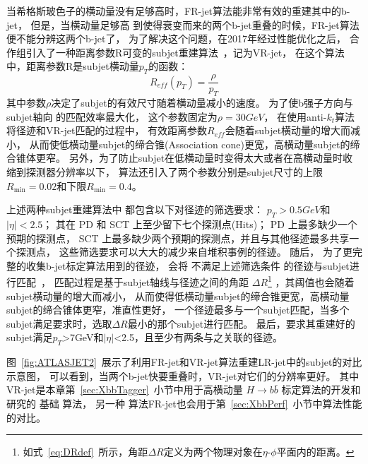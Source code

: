 当希格斯玻色子的横动量没有足够高时，FR-jet算法能非常有效的重建其中的b-jet，
但是，当横动量足够高
到使得衰变而来的两个b-jet重叠的时候，FR-jet算法便不能分辨这两个b-jet了，
为了解决这个问题，在2017年经过性能优化之后，
合作组引入了一种距离参数R可变的subjet重建算法~\cite{VRJET1,VRJET2}，记为VR-jet，
在这个算法中，距离参数R是subjet横动量$p_T$的函数：
\begin{equation} 
\label{eq:VR}
R_{eff}(p_{T})=\frac{\rho}{p_T}
\end{equation}
其中参数$\rho$决定了subjet的有效尺寸随着横动量减小的速度。
为了使b强子方向与subjet轴向
的匹配效率最大化，
这个参数固定为$\rho=30GeV$，
在使用anti-$k_t$算法将径迹和VR-jet匹配的过程中，
有效距离参数$R_{eff}$会随着subjet横动量的增大而减小，
从而使低横动量subjet的缔合锥(Association cone)更宽，高横动量subjet的缔合锥体更窄。
另外，为了防止subjet在低横动量时变得太大或者在高横动量时收缩到探测器分辨率以下，
算法还引入了两个参数分别是subjet尺寸的上限$R_{\text{min}}=0.02$和下限$R_{\text{min}}=0.4$。

上述两种subjet重建算法中
都包含以下对径迹的筛选要求：
$p_{T}>0.5GeV$和$|\eta|<2.5$；
其在
PD
和
SCT
上至少留下七个探测点(Hits)；
PD
上最多缺少一个预期的探测点，
SCT
上最多缺少两个预期的探测点，并且与其他径迹最多共享一个探测点，
这些筛选要求可以大大的减少来自堆积事例的径迹。
随后，
为了更完整的收集b-jet标定算法用到的径迹，
会将
不满足上述筛选条件
的径迹与subjet进行匹配~\cite{TRAVR}，
匹配过程是基于subjet轴线与径迹之间的角距
$\Delta R$\footnote{如式~\ref{eq:DRdef}~所示，角距$\Delta R$定义为两个物理对象在$\eta$-$\phi$平面内的距离。}
，其阈值也会随着subjet横动量的增大而减小，
从而使得低横动量subjet的缔合锥更宽，高横动量subjet的缔合锥体更窄，准直性更好，
一个径迹最多与一个subjet匹配，当多个subjet满足要求时，选取$\Delta R$最小的那个subjet进行匹配。
最后，要求其重建好的subjet满足$p_{T}$>7GeV和$|\eta|$<2.5，且至少有两条与之关联的径迹。

图~\ref{fig:ATLASJET2}~展示了利用FR-jet和VR-jet算法重建LR-jet中的subjet的对比示意图，
可以看到，当两个b-jet快要重叠时，VR-jet对它们的分辨率更好。
其中VR-jet是本章第~\ref{sec:XbbTagger}~小节中用于高横动量
$H\rightarrow b\bar{b}$
标定算法的开发和研究的
基础
算法，
另一种
算法FR-jet也会用于第~\ref{sec:XbbPerf}~小节中算法性能的对比。

